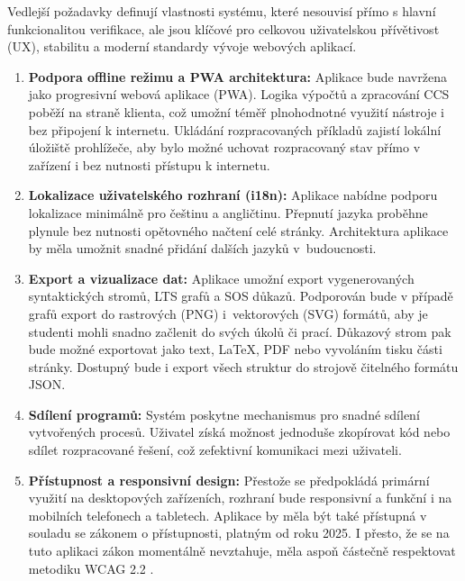 Vedlejší požadavky definují vlastnosti systému, které nesouvisí přímo s hlavní funkcionalitou verifikace, ale jsou klíčové pro celkovou uživatelskou přívětivost (UX), stabilitu a moderní standardy vývoje webových aplikací.

\begin{enumerate}
    \item \textbf{Podpora offline režimu a PWA architektura:} 
    Aplikace bude navržena jako progresivní webová aplikace (PWA). 
    Logika výpočtů a zpracování CCS poběží na straně klienta, což umožní téměř plnohodnotné využití nástroje i bez připojení k internetu. 
    Ukládání rozpracovaných příkladů zajistí lokální úložiště prohlížeče, aby bylo možné uchovat rozpracovaný stav přímo v zařízení i bez nutnosti přístupu k internetu.
    
    \item \textbf{Lokalizace uživatelského rozhraní (i18n):} 
    Aplikace nabídne podporu lokalizace minimálně pro češtinu a angličtinu. 
    Přepnutí jazyka proběhne plynule bez nutnosti opětovného načtení celé stránky. 
    Architektura aplikace by měla umožnit snadné přidání dalších jazyků v~budoucnosti.
    
    \item \textbf{Export a vizualizace dat:} 
    Aplikace umožní export vygenerovaných syntaktických stromů, LTS grafů a SOS důkazů. 
    Podporován bude v případě grafů export do rastrových (PNG) i~vektorových (SVG) formátů, aby je studenti mohli snadno začlenit do svých úkolů či prací. 
    Důkazový strom pak bude možné exportovat jako text, \LaTeX, PDF nebo vyvoláním tisku části stránky.
    Dostupný bude i export všech struktur do strojově čitelného formátu JSON.
    
    \item \textbf{Sdílení programů:} 
    Systém poskytne mechanismus pro snadné sdílení vytvořených procesů. 
    Uživatel získá možnost jednoduše zkopírovat kód nebo sdílet rozpracované řešení, což zefektivní komunikaci mezi uživateli.
    
    \item \textbf{Přístupnost a responsivní design:} 
    Přestože se předpokládá primární využití na desktopových zařízeních, rozhraní bude responsivní a funkční i na mobilních telefonech a tabletech. 
    Aplikace by měla být také přístupná v souladu se zákonem o přístupnosti, platným od roku 2025. I přesto, že se na tuto aplikaci zákon momentálně nevztahuje, měla aspoň částečně respektovat metodiku WCAG 2.2 \cite{pristupnostWebu}.
    

\end{enumerate}
